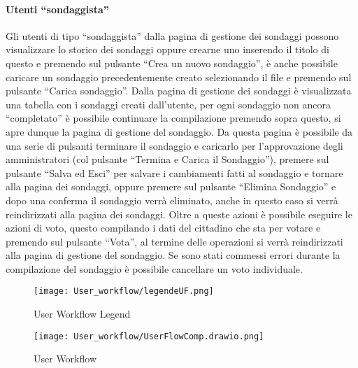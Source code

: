 \paragraph{Utenti ``sondaggista''}
Gli utenti di tipo ``sondaggista'' dalla pagina di gestione dei sondaggi possono visualizzare lo storico dei sondaggi oppure crearne uno inserendo il titolo di questo e premendo sul pulsante ``Crea un nuovo sondaggio'', è anche possibile caricare un sondaggio precedentemente creato selezionando il file e premendo sul pulsante ``Carica sondaggio''. Dalla pagina di gestione dei sondaggi è visualizzata una tabella con i sondaggi creati dall'utente, per ogni sondaggio non ancora ``completato'' è possibile continuare la compilazione premendo sopra questo, si apre dunque la pagina di gestione del sondaggio. Da questa pagina è possibile da una serie di pulsanti terminare il sondaggio e caricarlo per l'approvazione degli amministratori (col pulsante ``Termina e Carica il Sondaggio''), premere sul pulsante ``Salva ed Esci'' per salvare i cambiamenti fatti al sondaggio e tornare alla pagina dei sondaggi, oppure premere sul pulsante ``Elimina Sondaggio'' e dopo una conferma il sondaggio verrà eliminato, anche in questo caso si verrà reindirizzati alla pagina dei sondaggi. Oltre a queste azioni è possibile eseguire le azioni di voto, questo compilando i dati del cittadino che sta per votare e premendo sul pulsante ``Vota'', al termine delle operazioni si verrà reindirizzati alla pagina di gestione del sondaggio. Se sono stati commessi errori durante la compilazione del sondaggio è possibile cancellare un voto individuale.
\begin{figure}
    \centering
    \texttt{[image: User\_workflow/legendeUF.png]}
    \caption{User Workflow Legend}
    \label{fig:UserWorkflowLegend}
\end{figure}
\begin{figure}
    \centering
    \texttt{[image: User\_workflow/UserFlowComp.drawio.png]}
    \caption{User Workflow}
    \label{fig:UserWorkflow}
\end{figure}